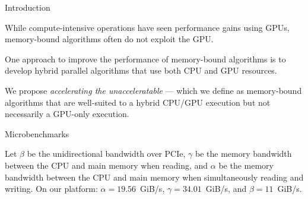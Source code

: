 \documentclass[final]{beamer}
\newlength{\colwidth}
\begin{document}
\begin{frame}[t]
\begin{columns}[t]
\begin{column}{\colwidth}
\begin{block}{Introduction}
\begin{description}[font=$\bullet$~\normalfont\scshape\color{red!50!black}]
\item While compute-intensive operations have seen performance gains using GPUs, memory-bound algorithms often do not exploit the GPU.

\item One approach to improve the performance of memory-bound algorithms is to develop hybrid parallel algorithms that use both CPU and GPU resources.


\item We propose \emph{accelerating the unacceleratable} --- which we define as memory-bound algorithms that are well-suited to a hybrid CPU/GPU execution but not necessarily a GPU-only execution. 


\end{description}  

  \end{block}

\begin{alertblock}{Microbenchmarks}
 
\begin{description}[font=$\bullet$~\normalfont\scshape\color{red!50!black}]

\item Let $\beta$ be the unidirectional bandwidth over PCIe, $\gamma$ be the memory bandwidth between the CPU and main memory when reading, and $\alpha$ be the memory bandwidth between the CPU and main memory when simultaneously reading and writing. On our platform: $\alpha=19.56$~GiB/s, $\gamma=34.01$~GiB/s, and $\beta=11$~GiB/s.


\end{description}
\end{alertblock}
\end{column}
\end{columns}
\end{frame}
\end{document}
